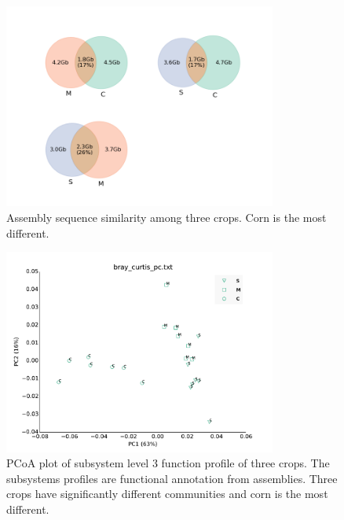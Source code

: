 \documentclass[12pt]{article}
\begin{document}
    \begin{figure}[tbph!]
    \centering
    \includegraphics[width=0.8\textwidth]{figures/contig-sim-venn}
    \caption[Assembly sequence similarity]{Assembly sequence similarity among three crops. Corn is the most different.}
    \label{fig:contig-sim-venn}
    \end{figure}


    \begin{figure}[tbph!]
    \centering
    \includegraphics[width=0.8\textwidth]{figures/subsys-l3-pcoa}
    \caption[PCoA plot based on subsystem profile]{PCoA plot of subsystem level 3 function profile of three crops. The subsystems profiles are functional annotation from assemblies. Three crops have significantly different communities and corn is the most different.}
    \label{fig:subsys-l3-pcoa}
    \end{figure}
\end{document}
